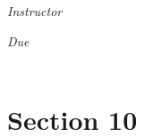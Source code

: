 \documentclass[12pt, oneside]{book}
\begin{document}
\begin{titlepage}
\begin{center}
\begin{large}
            \vspace*{1\baselineskip}

            \textit{Instructor} \\[1ex] %
            \professor

            \vspace*{1\baselineskip}

            \textit{Due}\\[1ex]
            {\scshape  \finaldate} \\[0.3\baselineskip] %

            \thispagestyle{empty}

        \end{large}
    \end{center}
\end{titlepage}
\section*{Section 10}

\end{document}
